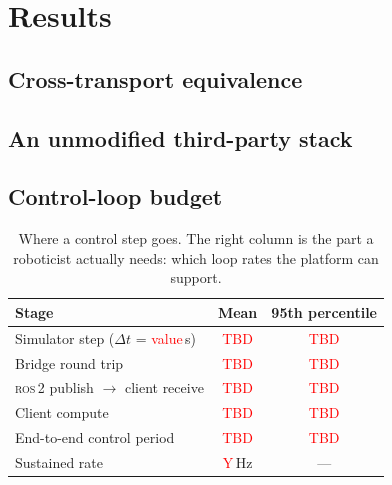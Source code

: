 \documentclass[pdflatex,sn-mathphys-num]{template/sn-jnl}%
\newcommand{\tbd}[1][TBD]{\textcolor{red}{#1}}
\newcommand{\ph}[1]{\textcolor{red}{\langle #1\rangle}}
\newcommand{\simstep}{\ensuremath{\Delta t}}
\newcommand{\ros}{\textsc{ros}\,2}
\begin{document}
\section{Results}
\label{sec:results}

\subsection{Cross-transport equivalence}
\label{sec:results:equivalence}

\subsection{An unmodified third-party stack}
\label{sec:results:stack}

\subsection{Control-loop budget}
\label{sec:results:timing}
\begin{table}[t]
  \centering
  \caption{Where a control step goes. The right column is the part a roboticist
  actually needs: which loop rates the platform can support.}
  \label{tab:timing}
  \begin{tabular}{lcc}
    \toprule
    Stage & Mean & 95th percentile \\
    \midrule
    Simulator step (\simstep{} = \ph{value}\,s)      & \tbd & \tbd \\
    Bridge round trip                                & \tbd & \tbd \\
    \ros{} publish $\to$ client receive              & \tbd & \tbd \\
    Client compute                                   & \tbd & \tbd \\
    End-to-end control period                        & \tbd & \tbd \\
    \midrule
    Sustained rate                                   & \ph{Y}\,Hz & --- \\
    \bottomrule
  \end{tabular}
\end{table}
\end{document}
